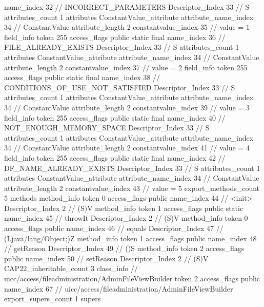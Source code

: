 {{{{{				name_index	32		// INCORRECT_PARAMETERS
				Descriptor_Index	33		// S
				attributes_count	1
				attributes {
				ConstantValue_attribute {
					attribute_name_index	34		// ConstantValue
					attribute_length	2
					constantvalue_index	35		// value = 1
				}
				}
			}
			field_info {
				token	255
				access_flags	public static final
				name_index	36		// FILE_ALREADY_EXISTS
				Descriptor_Index	33		// S
				attributes_count	1
				attributes {
				ConstantValue_attribute {
					attribute_name_index	34		// ConstantValue
					attribute_length	2
					constantvalue_index	37		// value = 2
				}
				}
			}
			field_info {
				token	255
				access_flags	public static final
				name_index	38		// CONDITIONS_OF_USE_NOT_SATISFIED
				Descriptor_Index	33		// S
				attributes_count	1
				attributes {
				ConstantValue_attribute {
					attribute_name_index	34		// ConstantValue
					attribute_length	2
					constantvalue_index	39		// value = 3
				}
				}
			}
			field_info {
				token	255
				access_flags	public static final
				name_index	40		// NOT_ENOUGH_MEMORY_SPACE
				Descriptor_Index	33		// S
				attributes_count	1
				attributes {
				ConstantValue_attribute {
					attribute_name_index	34		// ConstantValue
					attribute_length	2
					constantvalue_index	41		// value = 4
				}
				}
			}
			field_info {
				token	255
				access_flags	public static final
				name_index	42		// DF_NAME_ALREADY_EXISTS
				Descriptor_Index	33		// S
				attributes_count	1
				attributes {
				ConstantValue_attribute {
					attribute_name_index	34		// ConstantValue
					attribute_length	2
					constantvalue_index	43		// value = 5
				}
				}
			}
			}
			export_methods_count	5
			methods {
				method_info {
					token	0
					access_flags	public
					name_index	44		// <init>
					Descriptor_Index	2		// (S)V
				}
				method_info {
					token	1
					access_flags	public static
					name_index	45		// throwIt
					Descriptor_Index	2		// (S)V
				}
				method_info {
					token	0
					access_flags	public
					name_index	46		// equals
					Descriptor_Index	47		// (Ljava/lang/Object;)Z
				}
				method_info {
					token	1
					access_flags	public
					name_index	48		// getReason
					Descriptor_Index	49		// ()S
				}
				method_info {
					token	2
					access_flags	public
					name_index	50		// setReason
					Descriptor_Index	2		// (S)V
				}
			}
			CAP22_inheritable_count	3
		}
		class_info {		// uicc/access/fileadministration/AdminFileViewBuilder
			token	2
			access_flags	public
			name_index	67		// uicc/access/fileadministration/AdminFileViewBuilder
			export_supers_count	1
			supers {
}}}}
